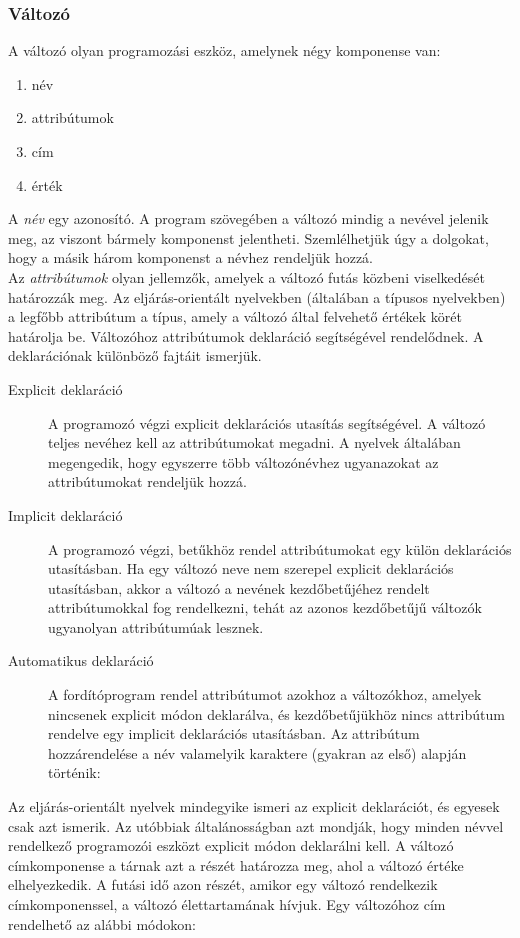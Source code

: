 \subsubsection{Változó}
A változó olyan programozási eszköz, amelynek négy komponense van:
\begin{enumerate}[noitemsep]
	\item név
	\item attribútumok
	\item cím
	\item érték
\end{enumerate}
A \emph{név} egy azonosító. A program szövegében a változó mindig a nevével jelenik meg, az viszont bármely komponenst jelentheti. Szemlélhetjük úgy a dolgokat, hogy a másik három komponenst a névhez rendeljük hozzá.\\
Az \emph{attribútumok} olyan jellemzők, amelyek a változó futás közbeni viselkedését határozzák meg. Az eljárás-orientált nyelvekben (általában a típusos nyelvekben) a legfőbb attribútum a típus, amely a változó által felvehető értékek körét határolja be. Változóhoz attribútumok deklaráció segítségével rendelődnek. A deklarációnak különböző fajtáit ismerjük.
\begin{description}
	\item[Explicit deklaráció] A programozó végzi explicit deklarációs utasítás segítségével. A változó teljes nevéhez kell az attribútumokat megadni. A nyelvek általában megengedik, hogy egyszerre több változónévhez ugyanazokat az attribútumokat rendeljük hozzá.
	\item[Implicit deklaráció] A programozó végzi, betűkhöz rendel attribútumokat egy külön deklarációs utasításban. Ha egy változó neve nem szerepel explicit deklarációs utasításban, akkor a változó a nevének kezdőbetűjéhez rendelt attribútumokkal fog rendelkezni, tehát az azonos kezdőbetűjű változók ugyanolyan attribútumúak lesznek.
	\item[Automatikus deklaráció] A fordítóprogram rendel attribútumot azokhoz a változókhoz, amelyek nincsenek explicit módon deklarálva, és kezdőbetűjükhöz nincs attribútum rendelve egy implicit deklarációs utasításban. Az attribútum hozzárendelése a név valamelyik karaktere (gyakran az első) alapján történik:
\end{description}
Az eljárás-orientált nyelvek mindegyike ismeri az explicit deklarációt, és egyesek csak azt ismerik. Az utóbbiak általánosságban azt mondják, hogy minden névvel rendelkező programozói eszközt explicit módon deklarálni kell. A változó címkomponense a tárnak azt a részét határozza meg, ahol a változó értéke elhelyezkedik. A futási idő azon részét, amikor egy változó rendelkezik címkomponenssel, a változó élettartamának hívjuk. Egy változóhoz cím rendelhető az alábbi módokon:
